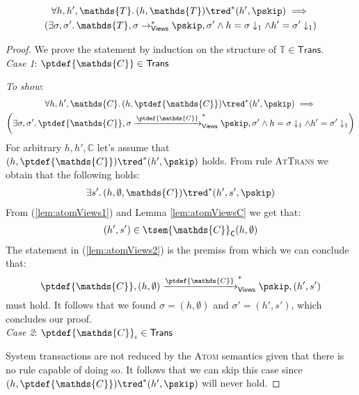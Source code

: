 \begin{lem}
	\label{lem:atomViews}
	\begin{gather*}
		\forall h, h', \mathds{T} \ldotp
		(h, \mathds{T}) \tred^* (h', \pskip)
		\implies \\
		\left(		
			\exists \sigma, \sigma' \ldotp
			\mathds{T}, \sigma \rightarrow^*_{\mathsf{Views}} \pskip, \sigma'
			\land h = \sigma \downarrow_1 \land h' = \sigma' \downarrow_1
		\right)
	\end{gather*}
	{\parindent0pt
	\begin{proof}
	We prove the statement by induction on the structure of $\mathds{T} \in \mathsf{Trans}$. \\
	
	\textit{Case 1}: $\ptdef{\mathds{C}} \in \mathsf{Trans}$
	
	\textit{To show}:
	\begin{gather*}
		\forall h, h', \mathds{C} \ldotp
		(h, \ptdef{\mathds{C}}) \tred^* (h', \pskip)
		\implies \\
		\left(		
			\exists \sigma, \sigma' \ldotp
			\ptdef{\mathds{C}}, \sigma \xrightarrow{\ptdef{\mathds{C}}}^*_{\mathsf{Views}} \pskip, \sigma'
			\land h = \sigma \downarrow_1 \land h' = \sigma' \downarrow_1
		\right)
	\end{gather*}
	For arbitrary $h, h', \mathds{C}$ let's assume that $(h, \ptdef{\mathds{C}}) \tred^* (h', \pskip)$ holds. From rule \textsc{AtTrans} we obtain that the following holds:
	\begin{gather}
		\label{lem:atomViews1}
		\exists s' \ldotp
		(h, \emptyset, \mathds{C}) \tred^* (h', s', \pskip)
	\end{gather}
	From (\ref{lem:atomViews1}) and Lemma \ref{lem:atomViewsC} we get that:
	\begin{gather}
		\label{lem:atomViews2}
		(h', s') \in \tsem{\mathds{C}}_\mathsf{C}(h, \emptyset)
	\end{gather}
	The statement in (\ref{lem:atomViews2}) is the premiss from which we can conclude that:
	\[
		\ptdef{\mathds{C}}, (h, \emptyset) \xrightarrow{\ptdef{\mathds{C}}}^*_{\mathsf{Views}} \pskip, (h', s')
	\]
	must hold. It follows that we found $\sigma = (h, \emptyset)$ and $\sigma' = (h', s')$, which concludes our proof.
	\\	
	
	\textit{Case 2}: $\ptdef{\mathds{C}}_\iota \in \mathsf{Trans}$
	
	System transactions are not reduced by the \textsc{Atom} semantics given that there is no rule capable of doing so. It follows that we can skip this case since $(h, \ptdef{\mathds{C}}) \tred^* (h', \pskip)$ will never hold.
	\end{proof}
	}
\end{lem}

